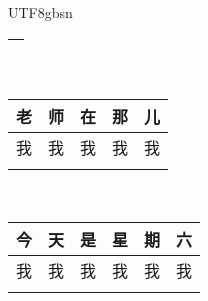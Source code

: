 \documentclass{article}
\newlength\mycolw
\newcommand{\myfont}{gbsn} %
\begin{document}
\begin{CJK}{UTF8}{\myfont}
\begin{tabular}{|p{\mycolw}|p{\mycolw}|p{\mycolw}|p{\mycolw}|p{\mycolw}|p{\mycolw}|p{\mycolw}|}
\multicolumn{7}{|l|}{} \\ \hline
\end{tabular}
\\ \vspace{0.3 in}
\setlength{}
\addtolength\mycolw{-2\tabcolsep}
\begin{tabular}{|p{\mycolw}|p{\mycolw}|p{\mycolw}|p{\mycolw}|p{\mycolw}|} \hline
老 &师 &在 &那 &儿 \\ \hline
\color{white} 我 &\color{white} 我 &\color{white} 我 &\color{white} 我 & \color{white} 我 \\ \hline
\multicolumn{5}{|l|}{} \\ \hline
\end{tabular}
\\ \vspace{0.3 in}
\setlength{}
\addtolength\mycolw{-2\tabcolsep}
\begin{tabular}{|p{\mycolw}|p{\mycolw}|p{\mycolw}|p{\mycolw}|p{\mycolw}|p{\mycolw}|} \hline
今 &天 &是 &星 &期 &六 \\ \hline
\color{white} 我 &\color{white} 我 &\color{white} 我 &\color{white} 我 &\color{white} 我 & \color{white} 我 \\ \hline
\multicolumn{6}{|l|}{} \\ \hline
\end{tabular}
\\ \vspace{0.3 in}

\end{CJK} 
\end{document}
